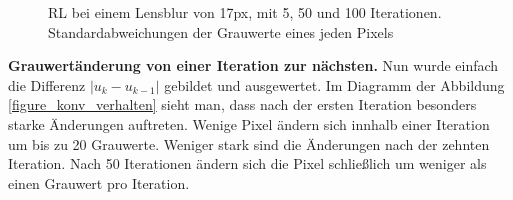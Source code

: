 \documentclass[a4paper,12pt]{article}
\begin{document}
\begin{figure}[htbp]
\caption{RL bei einem Lensblur von 17px, mit 5, 50 und 100 Iterationen.
Standardabweichungen der Grauwerte eines jeden Pixels}%
\label{figure_konv_histogramm}
\end{figure}
 
 
 
\textbf{Grauwertänderung von einer Iteration zur nächsten.}
Nun wurde einfach die Differenz $|u_k-u_{k-1}|$ gebildet und ausgewertet. Im
Diagramm der Abbildung \ref{figure_konv_verhalten} sieht man, dass nach der
ersten Iteration besonders starke Änderungen auftreten. Wenige Pixel ändern sich
innhalb einer Iteration um bis zu 20 Grauwerte. Weniger stark sind die
Änderungen nach der zehnten Iteration. Nach 50 Iterationen ändern sich die Pixel
schließlich um weniger als einen Grauwert pro Iteration. 
\end{document}
